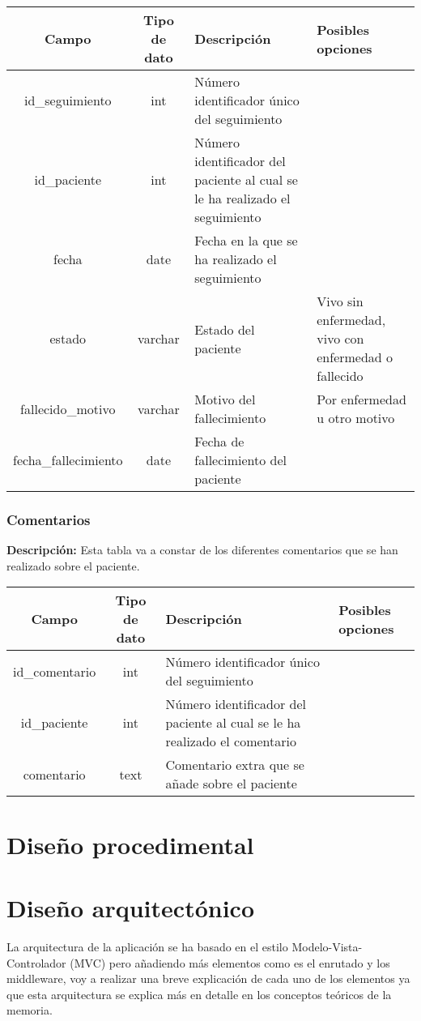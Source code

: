 \begin{longtable}{|c |c |p{3.9cm} |p{3cm} |}
\hline
Campo & Tipo de dato & Descripción & Posibles opciones\\ \hline
id\_seguimiento & int & Número identificador único del seguimiento &\\\hline
id\_paciente & int & Número identificador del paciente al cual se le ha realizado el seguimiento &\\\hline
fecha & date & Fecha en la que se ha realizado el seguimiento & \\\hline
estado & varchar & Estado del paciente & Vivo sin enfermedad, vivo con enfermedad o fallecido \\\hline
fallecido\_motivo & varchar & Motivo del fallecimiento & Por enfermedad u otro motivo\\\hline
fecha\_fallecimiento & date & Fecha de fallecimiento del paciente &\\\hline
\end{longtable}

\subsubsection{Comentarios}

\textbf{Descripción:} Esta tabla va a constar de los diferentes comentarios que se han realizado sobre el paciente.

\begin{longtable}{|c |c |p{3.6cm} |p{4cm} |}
\hline
Campo & Tipo de dato & Descripción & Posibles opciones\\ \hline
id\_comentario & int & Número identificador único del seguimiento &\\\hline
id\_paciente & int & Número identificador del paciente al cual se le ha realizado el comentario &\\\hline
comentario & text & Comentario extra que se añade sobre el paciente& \\\hline
\end{longtable}

\section{Diseño procedimental}

\section{Diseño arquitectónico}

La arquitectura de la aplicación se ha basado en el estilo Modelo-Vista-Controlador (MVC) pero añadiendo más elementos como es el enrutado y los middleware, voy a realizar una breve explicación de cada uno de los elementos ya que esta arquitectura se explica más en detalle en los conceptos teóricos de la memoria.

